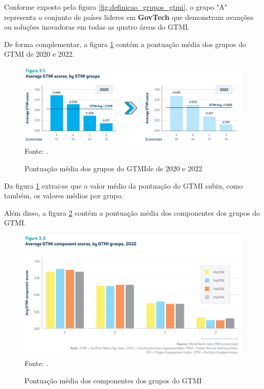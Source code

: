 Conforme exposto pela figura \ref{fig:definicao_grupos_gtmi}, o grupo "A" representa o conjunto de países lideres em \textbf{GovTech} que demonstram avanções ou soluções inovadoras em todas as quatro áreas do GTMI.

De forma complementar, a figura \ref{fig:avg_gtmi_scores} contém a pontuação média dos grupos do GTMI de 2020 e 2022.

\begin{figure}[H]
	\centering
	\caption{Pontuação média dos grupos do GTMIde de 2020 e 2022}
	\includegraphics[width=1\linewidth]{figuras/avg_gtmi_scores}
	\label{fig:avg_gtmi_scores}
	\footnotesize{Fonte: \cite{gtmi_2022}.}
\end{figure}

Da figura \ref{fig:avg_gtmi_scores} extrai-se que o valor médio da pontuação do GTMI subiu, como também, os valores médios por grupo. 

Além disso, a figura \ref{fig:avg_gtmi_scores_groups} contém a pontuação média dos componentes dos grupos do GTMI. 

\begin{figure}[H]
	\centering
	\caption{Pontuação média dos componentes dos grupos do GTMI}
	\includegraphics[width=1\linewidth]{figuras/avg_gtmi_scores_groups}
	\label{fig:avg_gtmi_scores_groups}
	\footnotesize{Fonte: \cite{gtmi_2022}.}
\end{figure}

